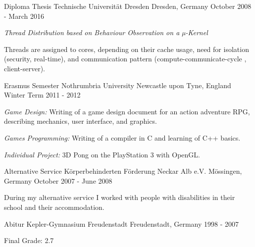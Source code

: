 \begin{cventries}
  \cventry
    {Diploma Thesis}
    {Technische Universität Dresden}
    {Dresden, Germany}
    {October 2008 - March 2016}
    {
      \begin{cvitems}
      \item {\textit{Thread Distribution based on Behaviour Observation on a
	µ-Kernel}}
      \item {Threads are assigned to cores, depending on their cache usage,
	  need for isolation (security, real-time), and communication pattern
	  (compute-communicate-cycle , client-server).}
      \end{cvitems}
    }
  \cventry
    {Erasmus Semester}
    {Nothrumbria University}
    {Newcastle upon Tyne, England}
    {Winter Term 2011 - 2012}
    {
      \begin{cvitems}
      \item {\textit{Game Design:} Writing of a game design document for an action
	adventure RPG, describing mechanics, user interface, and graphics.}
    \item {\textit{Games Programming:} Writing of a compiler in C and learning
        of C++ basics. }
    \item {\textit{Individual Project:} 3D Pong on the PlayStation 3 with OpenGL.}
      \end{cvitems}
    }
  \cventry
    {Alternative Service}
    {Körperbehinderten Förderung Neckar Alb e.V.}
    {Mössingen, Germany}
    {October 2007 - June 2008}
    {
      \begin{cvitems}
      \item {During my alternative service I worked with people with disabilities in
	their school and their accommodation.}
      \end{cvitems}
    }
  \cventry
    {Abitur}
    {Kepler-Gymnasium Freudenstadt}
    {Freudenstadt, Germany}
    {1998 - 2007}
    {
      \begin{cvitems}
      \item {Final Grade: 2.7}
      \end{cvitems}
    }
\end{cventries}
